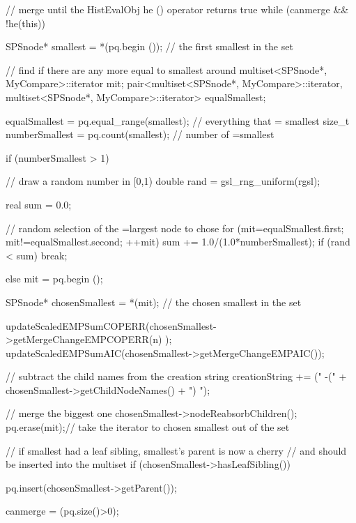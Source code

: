 \begin{DoxyCode}
{{        // merge until the HistEvalObj he () operator returns true
        while (canmerge && !he(this)) {

            SPSnode* smallest = *(pq.begin ()); // the first smallest in the
       set

            // find if there are any more equal to smallest around
            multiset<SPSnode*, MyCompare>::iterator mit;
            pair<multiset<SPSnode*, MyCompare>::iterator,
                multiset<SPSnode*, MyCompare>::iterator> equalSmallest;

            equalSmallest = pq.equal_range(smallest); // everything that =
       smallest
            size_t numberSmallest = pq.count(smallest); // number of =smallest

            if (numberSmallest > 1) {
                // draw a random number in [0,1)
                double rand = gsl_rng_uniform(rgsl);

                real sum = 0.0;

                // random selection of the =largest node to chose
                for (mit=equalSmallest.first; mit!=equalSmallest.second; ++mit)
       {
                    sum += 1.0/(1.0*numberSmallest);
                    if (rand < sum) {
                        break;
                    }
                }
            }
            else mit = pq.begin ();

            SPSnode* chosenSmallest = *(mit); // the chosen smallest in the set

            updateScaledEMPSumCOPERR(chosenSmallest->getMergeChangeEMPCOPERR(n)
      );
            updateScaledEMPSumAIC(chosenSmallest->getMergeChangeEMPAIC());

            // subtract the child names from the creation string
            creationString += (" -(" + chosenSmallest->getChildNodeNames() + ")
      ");

            // merge the biggest one
            chosenSmallest->nodeReabsorbChildren();
            pq.erase(mit);// take the iterator to chosen smallest out of the
       set

            // if smallest had a leaf sibling, smallest's parent is now a
       cherry
            // and should be inserted into the multiset
            if (chosenSmallest->hasLeafSibling()) {

                pq.insert(chosenSmallest->getParent());
           }

            canmerge = (pq.size()>0);

}}}
\end{DoxyCode}
